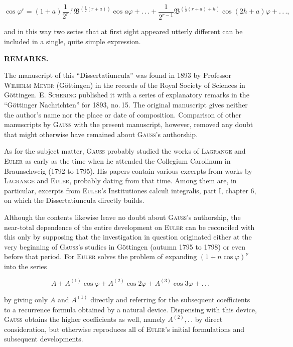 \[
\cos\varphi^r=(1+a)\frac{1}{2^r}.{}^{r}\mathfrak{B}^{(\frac12(r+a))}\cos a\varphi+.\,.\,.+\frac{1}{2^{r-1}}\mathfrak{B}^{(\frac12(r+a)+h)}\cos(2h+a)\varphi+.\,.\,.,
\]

\noindent and in this way two series that at first sight appeared utterly different can be included in a single, quite simple expression.

\par\smallskip\hrulefill\smallskip\par

\begin{center}\textbf{REMARKS.}\end{center}

The manuscript of this “Dissertatiuncula” was found in 1893 by Professor \textsc{Wilhelm Meyer} (Göttingen) in the records of the Royal Society of Sciences in Göttingen. E. \textsc{Schering} published it with a series of explanatory remarks in the “Göttinger Nachrichten” for 1893, no.\,15. The original manuscript gives neither the author's name nor the place or date of composition. Comparison of other manuscripts by \textsc{Gauss} with the present manuscript, however, removed any doubt that might otherwise have remained about \textsc{Gauss}'s authorship.

As for the subject matter, \textsc{Gauss} probably studied the works of \textsc{Lagrange} and \textsc{Euler} as early as the time when he attended the Collegium Carolinum in Braunschweig (1792 to 1795). His papers contain various excerpts from works by \textsc{Lagrange} and \textsc{Euler}, probably dating from that time. Among them are, in particular, excerpts from \textsc{Euler}'s Institutiones calculi integralis, part I, chapter 6, on which the Dissertatiuncula directly builds.

Although the contents likewise leave no doubt about \textsc{Gauss}'s authorship, the near-total dependence of the entire development on \textsc{Euler} can be reconciled with this only by supposing that the investigation in question originated either at the very beginning of \textsc{Gauss}'s studies in Göttingen (autumn 1795 to 1798) or even before that period. For \textsc{Euler} solves the problem of expanding $(1+n\cos\varphi)^\nu$ into the series

\[
A + A^{(1)}\cos\varphi + A^{(2)}\cos 2\varphi + A^{(3)}\cos 3\varphi + .\,.\,.
\]

\noindent by giving only $A$ and $A^{(1)}$ directly and referring for the subsequent coefficients to a recurrence formula obtained by a natural device. Dispensing with this device, \textsc{Gauss} obtains the higher coefficients as well, namely $A^{(2)}$,\,.\,. by direct consideration, but otherwise reproduces all of \textsc{Euler}'s initial formulations and subsequent developments.

